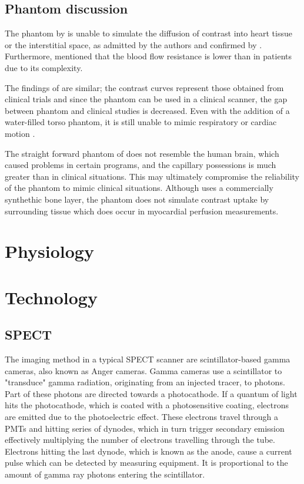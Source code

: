 \subsection{Phantom discussion}
The phantom by \cite{chiribiri2013perfusion} is unable to simulate the diffusion of contrast into heart tissue or the interstitial space, as admitted by the authors and confirmed by \cite{otton2013direct, o2017effect}. Furthermore, \cite{chiribiri2013perfusion} mentioned that the blood flow resistance is lower than in patients due to its complexity.

The findings of \cite{otton2013direct} are similar; the contrast curves represent those obtained from clinical trials and since the phantom can be used in a clinical  scanner, the gap between phantom and clinical studies is decreased. Even with the addition of a water-filled torso phantom, it is still unable to mimic respiratory or cardiac motion \citep{o2017feasibility}.

The straight forward phantom of \cite{suzuki2017quantitative} does not resemble the human brain, which caused problems in certain programs, and the capillary possessions is much greater than in clinical situations. This may ultimately compromise the reliability of the phantom to mimic clinical situations. Although \cite{hashimoto2018effect} uses a commercially synthethic bone layer, the phantom does not simulate contrast uptake by surrounding tissue which does occur in myocardial perfusion measurements.
\section{Physiology}


\section{Technology}
\subsection{SPECT}
The imaging method in a typical \ac{SPECT} scanner are scintillator-based gamma cameras, also known as Anger cameras. Gamma cameras use a scintillator to "transduce" gamma radiation, originating from an injected tracer, to photons. Part of these photons are directed towards a photocathode. If a quantum of light hits the photocathode, which is coated with a photosensitive coating, electrons are emitted due to the photoelectric effect. These electrons travel through a \acp{PMT} and hitting series of dynodes, which in turn trigger secondary emission effectively multiplying the number of electrons travelling through the tube. Electrons hitting the last dynode, which is known as the anode, cause a current pulse which can be detected by measuring equipment. It is proportional to the amount of gamma ray photons entering the scintillator\citep{CZTTech2009}.

